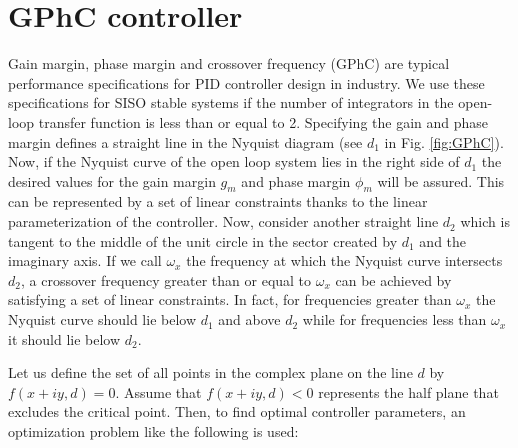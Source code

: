 \documentclass [12pt , a4paper] {report}
\begin{document}
\section{GPhC controller}
Gain margin, phase margin and crossover frequency (GPhC) are typical performance specifications for PID controller design in industry. We use these specifications for SISO stable systems if the number of integrators in the open-loop transfer function is less than or equal to 2. Specifying the gain and phase margin defines a straight line in the Nyquist diagram (see $d_1$ in Fig. \ref{fig:GPhC}). Now, if the Nyquist curve of the open loop system lies in the right side of $d_1$ the desired values for the gain margin $g_m$ and phase margin $\phi_m$ will be assured. This can be represented by a set of linear constraints thanks to the linear parameterization of the controller. Now, consider another straight line $d_2$ which is tangent to the middle of the unit circle in the sector created by $d_1$ and the imaginary axis. If we call $\omega_x$ the frequency at which the Nyquist curve intersects $d_2$, a crossover frequency greater than or equal to $\omega_x$ can be achieved by satisfying a set of linear constraints. In fact, for frequencies greater than $\omega_x$ the Nyquist curve should lie below $d_1$ and above $d_2$ while for frequencies less than $\omega_x$ it should lie below $d_2$.

Let us define the set of all points in the complex plane on the line $d$ by $f(x+iy, d) = 0$. Assume that $f(x+iy, d) < 0$ represents the half plane that excludes the critical point. Then, to find optimal controller parameters, an optimization problem like the following is used:
\end{document}
